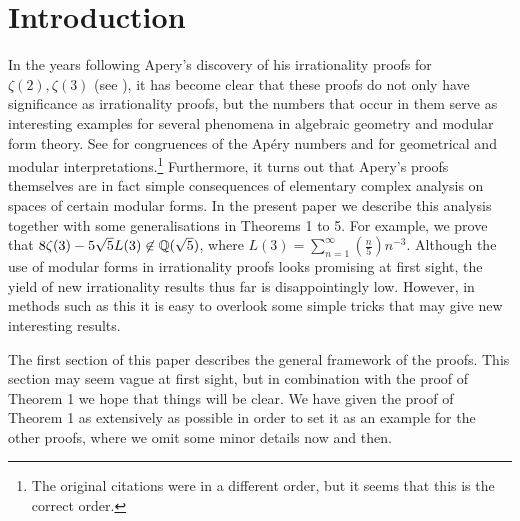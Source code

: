 \section{Introduction}

In the years following Apery's discovery of his irrationality proofs for $\zeta(2), \zeta(3)$ (see \cite{van1979proof}), it has become clear that these proofs do not only have significance as irrationality proofs, but the numbers that occur in them serve as interesting examples for several phenomena in algebraic geometry and modular form theory.
See \cite{gessel1982some,beukers1982irrationality,beukers1985some,beukers1987another} for congruences of the Ap\'ery numbers and \cite{beukers1984family,stienstra1985picard} for geometrical and modular interpretations.\footnote{The original citations were in a different order, but it seems that this is the correct order.}
Furthermore, it turns out that Apery's proofs themselves are in fact simple consequences of elementary complex analysis on spaces of certain modular forms.
In the present paper we describe this analysis together with some generalisations in Theorems 1 to 5. 
For example, we prove that $8\zeta(3) - 5 \sqrt{5} L(3) \not \in \mathbb{Q}(\sqrt{5})$, where $L(3) = \sum_{n=1}^{\infty} \left(\frac{n}{5}\right) n^{-3}$.
Although the use of modular forms in irrationality proofs looks promising at first sight, the yield of new irrationality results thus far is disappointingly low. 
However, in methods such as this it is easy to overlook some simple tricks that may give new interesting results.

The first section of this paper describes the general framework of the proofs.
This section may seem vague at first sight, but in combination with the proof of Theorem 1 we hope that things will be clear.
We have given the proof of Theorem 1 as extensively as possible in order to set it as an example for the other proofs, where we omit some minor details now and then. 